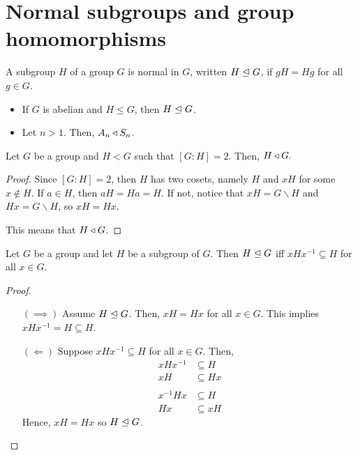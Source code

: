 \section{Normal subgroups and group homomorphisms}
    \renewcommand{\leftmark}{May 08, 2024}

    \begin{dfn}
        A subgroup \(H\) of a group \(G\) is normal in \(G\), written \(H \trianglelefteq G\), if \(gH = Hg\) for all \(g\in G\).
    \end{dfn}

    \begin{example}
        \mbox{}

        \begin{itemize}
            \item If \(G\) is abelian and \(H \leq G\), then \(H \trianglelefteq G\).
            \item Let \(n > 1\). Then, \(A_n \triangleleft S_n\).
        \end{itemize}
    \end{example}

    \begin{example}
        Let \(G\) be a group and \(H < G\) such that \([G : H] = 2\). Then, \(H \triangleleft G.\)
    \end{example}

    \begin{proof}
        Since \([G : H] = 2\), then \(H\) has two cosets, namely \(H\) and \(xH\) for some \(x\not\in H\). If \(a \in H\), then \(aH = Ha = H\). If not, notice that \(xH = G\backslash H\) and \(Hx = G\backslash H\), so \(xH = Hx\).

        This means that \(H \triangleleft G\).
    \end{proof}

    \begin{thm}
        Let \(G\) be a group and let \(H\) be a subgroup of \(G\). Then \(H \trianglelefteq G\) iff \(xHx^{-1} \subseteq H\) for all \(x\in G\).
    \end{thm}

    \begin{proof}
        \mbox{}
        \begin{itemize}
            \item[\((\implies)\)] Assume \(H \trianglelefteq G\). Then, \(xH = Hx\) for all \(x\in G\). This implies \(xHx^{-1} = H \subseteq H\).

            \item [\((\Longleftarrow)\)] Suppose \(xHx^{-1} \subseteq H\) for all \(x\in G\). Then,
            \begin{align*}
                xHx^{-1} &\subseteq H \\
                xH &\subseteq Hx \\\\
                x^{-1}Hx &\subseteq H \\
                Hx &\subseteq xH
            \end{align*}
            Hence, \(xH = Hx\) so \(H \trianglelefteq G\).
        \end{itemize}
    \end{proof}

